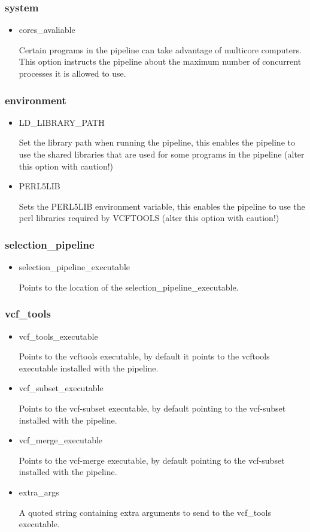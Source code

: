 \documentclass[a4paper,10pt]{article}
\begin{document}
\subsubsection{system}
\begin{itemize}
\item cores\_avaliable

Certain programs in the pipeline can take advantage of multicore
computers. This option instructs the pipeline about the maximum number
of concurrent processes it is allowed to use.
\end{itemize}
\subsubsection{environment}
\begin{itemize}
\item LD\_LIBRARY\_PATH

Set the library path when running the pipeline, this enables the
pipeline to use the shared libraries that are used for some programs
in the pipeline (alter this option with caution!)

\item PERL5LIB

Sets the PERL5LIB environment variable, this enables the pipeline to
use the perl libraries required by VCFTOOLS (alter this option with
caution!)

\end{itemize}
\subsubsection{selection\_pipeline}
\begin{itemize}
\item selection\_pipeline\_executable

Points to the location of the selection\_pipeline\_executable. 
\end{itemize}
\subsubsection{vcf\_tools}
\begin{itemize}
\item vcf\_tools\_executable 

Points to the vcftools executable, by default it points to the
vcftools executable installed with the pipeline.
\item vcf\_subset\_executable 

Points to the vcf-subset executable, by default pointing to the
vcf-subset installed with the pipeline.
\item vcf\_merge\_executable

Points to the vcf-merge executable, by default pointing to the
vcf-subset installed with the pipeline.
\item extra\_args 

A quoted string containing extra arguments to send to the vcf\_tools executable.
\end{itemize}
\end{document}
